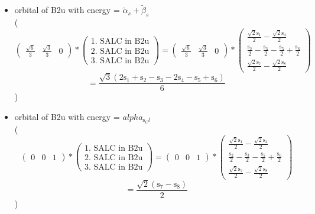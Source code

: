 \documentclass[12pt,a4paper]{article}
\begin{document}
\begin{itemize}
$$ $$ $$ = ?_{1} Norm^{2} \left(\frac{\sqrt{2} \text{s}_{1}}{2} + \frac{\sqrt{2} \text{s}_{4}}{2}\right) + ?_{2} Norm^{2} \left(\frac{\text{s}_{2}}{2} + \frac{\text{s}_{3}}{2} + \frac{\text{s}_{5}}{2} + \frac{\text{s}_{6}}{2}\right) + ?_{3} Norm^{2} \left(\frac{\sqrt{2} \text{s}_{7}}{2} + \frac{\sqrt{2} \text{s}_{8}}{2}\right) 
 $$ 
 )

\item orbital of B2u with energy = 
                                $\tilde{\alpha}_{s} + \tilde{\beta}_{s}$ \\
( 
$$
\begin{pmatrix}\frac{\sqrt{6}}{3} & \frac{\sqrt{3}}{3} & 0\end{pmatrix} * \left(\begin{array}{c}\text{1. SALC in B2u} \\ \text{2. SALC in B2u} \\ \text{3. SALC in B2u}\end{array}\right) = \begin{pmatrix}\frac{\sqrt{6}}{3} & \frac{\sqrt{3}}{3} & 0\end{pmatrix} * \begin{pmatrix}\frac{\sqrt{2} \text{s}_{1}}{2} - \frac{\sqrt{2} \text{s}_{4}}{2}\\\frac{\text{s}_{2}}{2} - \frac{\text{s}_{3}}{2} - \frac{\text{s}_{5}}{2} + \frac{\text{s}_{6}}{2}\\\frac{\sqrt{2} \text{s}_{7}}{2} - \frac{\sqrt{2} \text{s}_{8}}{2}\end{pmatrix} 
 $$ $$ = \frac{\sqrt{3} \left(2 \text{s}_{1} + \text{s}_{2} - \text{s}_{3} - 2 \text{s}_{4} - \text{s}_{5} + \text{s}_{6}\right)}{6} 
 $$ 
 )

\item orbital of B2u with energy = 
                                $alpha_{\text{s}_Cl}$ \\
( 
$$
\begin{pmatrix}0 & 0 & 1\end{pmatrix} * \left(\begin{array}{c}\text{1. SALC in B2u} \\ \text{2. SALC in B2u} \\ \text{3. SALC in B2u}\end{array}\right) = \begin{pmatrix}0 & 0 & 1\end{pmatrix} * \begin{pmatrix}\frac{\sqrt{2} \text{s}_{1}}{2} - \frac{\sqrt{2} \text{s}_{4}}{2}\\\frac{\text{s}_{2}}{2} - \frac{\text{s}_{3}}{2} - \frac{\text{s}_{5}}{2} + \frac{\text{s}_{6}}{2}\\\frac{\sqrt{2} \text{s}_{7}}{2} - \frac{\sqrt{2} \text{s}_{8}}{2}\end{pmatrix} 
 $$ $$ = \frac{\sqrt{2} \left(\text{s}_{7} - \text{s}_{8}\right)}{2} 
 $$ 
 )


\end{itemize}
\end{document}
